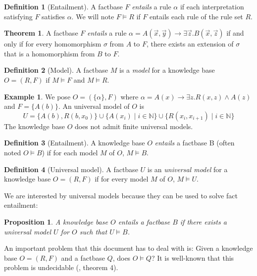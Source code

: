 \documentclass{article}
\newtheorem{proposition}{Proposition}[section]
\theoremstyle{definition}
\newtheorem{definition}{Definition}[section]
\newtheorem{theorem}{Theorem}[section]
\newtheorem{example}{Example}[section]
\theoremstyle{remark}
\def \N {\mathbb N}
\begin{document}
\begin{definition}[Entailment]
A factbase $F$ \emph{entails} a rule $\alpha$ if each interpretation satisfying $F$ satisfies $\alpha$. We will note $F \models R$ if $F$ entails each rule of the rule set $R$.
\end{definition}

\begin{theorem}
A factbase $F$ \emph{entails} a rule $\alpha = A(\vec x,\vec y) \rightarrow \exists \vec z. B(\vec x,\vec z)$ if and only if for every homomorphism $\sigma$ from $A$ to $F$, there exists an extension of $\sigma$ that is a homomorphism from $B$ to $F$.
\end{theorem}



\begin{definition}[Model]
A factbase $M$ is a \emph{model} for a knowledge base $O = (R,F)$ if $M \models F$ and $M \models R$.
\end{definition}




\begin{example} We pose $O = (\{\alpha\},F)$ where $\alpha = A(x) \rightarrow \exists z.R(x,z) \wedge A(z)$ and $F = \{A(b)\}$. An universal model of $O$ is $$U = \{A(b),R(b,x_0)\}\cup \{A(x_i)\mid i \in \N\}\cup \{R(x_i,x_{i+1}) \mid i \in \N\}$$ The knowledge base $O$ does not admit finite universal models.
\end{example}

\begin{definition}[Entailment]
A knowledge base $O$ \emph{entails} a factbase B (often noted $O \models B$) if for each model $M$ of $O$, $M \models B$.
\end{definition}

\begin{definition}[Universal model]
A factbase $U$ is an \emph{universal model} for a knowledge base $O = (R,F)$ if for
every model $M$ of $O$, $M \models U$.
\end{definition}


We are interested by universal models because  they can be used to solve fact entailment:

\begin{proposition}
A knowledge base $O$ entails a factbase $B$ if there exists a universal model $U$ for $O$ such that $U \models B$.
\end{proposition}

An important problem that this document has to deal with is: Given a knowledge base $O=(R,F)$ and a factbase $Q$,  does $O \models Q$? It  is  well-known  that  this  problem  is  undecidable (\cite{NP2}, theorem 4). 
\end{document}
